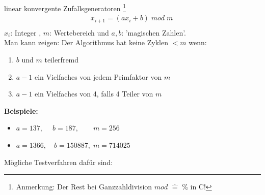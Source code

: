 \documentclass[12pt]{article}
\begin{document}
linear konvergente Zufallsgeneratoren \footnote{Anmerkung: Der Rest bei Ganzzahldivision $mod$ $\widehat{=}$ $\% $ in C!} 
\begin{align}
& x_{i+1}= (a x_i + b)\; mod \; m \quad \\
\end{align}
 $x_i$: Integer ,  $m$: Wertebereich und $a,b$: 'magischen Zahlen'. \\
Man kann zeigen: Der Algorithmus hat keine Zyklen $< m$ wenn:
\begin{enumerate}
\item $b$ und $m$ teilerfremd
\item $a-1$ ein Vielfaches von jedem Primfaktor von $m$
\item $a-1$ ein Vielfaches von 4, falls 4 Teiler von $m$
\end{enumerate}
\textbf{Beispiele:} \begin{itemize}
\item $a= 137, \; \quad b= 187, \quad \quad m=256$
\item $ a= 1366, \quad b=150887, \; m=714025$
\end{itemize}
Mögliche Testverfahren dafür sind:
\end{document}
